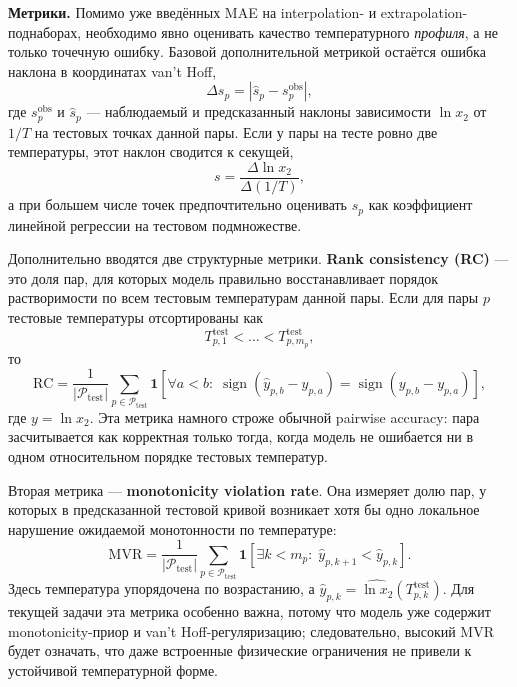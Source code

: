 \documentclass[11pt]{article}
\begin{document}
\textbf{Метрики.} Помимо уже введённых MAE на interpolation- и extrapolation-поднаборах, необходимо явно оценивать качество температурного \textit{профиля}, а не только точечную ошибку. Базовой дополнительной метрикой остаётся ошибка наклона в координатах van't Hoff,
\begin{equation*}
\Delta s_p = \left|\hat{s}_p-s^{\mathrm{obs}}_p\right|,
\end{equation*}
где $s^{\mathrm{obs}}_p$ и $\hat{s}_p$ --- наблюдаемый и предсказанный наклоны зависимости $\ln x_2$ от $1/T$ на тестовых точках данной пары. Если у пары на тесте ровно две температуры, этот наклон сводится к секущей,
\begin{equation*}
s=\frac{\Delta\ln x_2}{\Delta(1/T)},
\end{equation*}
а при большем числе точек предпочтительно оценивать $s_p$ как коэффициент линейной регрессии на тестовом подмножестве.

Дополнительно вводятся две структурные метрики. \textbf{Rank consistency (RC)} --- это доля пар, для которых модель правильно восстанавливает порядок растворимости по всем тестовым температурам данной пары. Если для пары $p$ тестовые температуры отсортированы как
\begin{equation*}
T^{\mathrm{test}}_{p,1} < \dots < T^{\mathrm{test}}_{p,m_p},
\end{equation*}
то
\begin{equation*}
\mathrm{RC} = \frac{1}{|\mathcal{P}_{\mathrm{test}}|}\sum_{p\in\mathcal{P}_{\mathrm{test}}}
\mathbf{1}\!\left[\forall a<b:\; \operatorname{sign}(\hat{y}_{p,b}-\hat{y}_{p,a}) = \operatorname{sign}(y_{p,b}-y_{p,a})\right],
\end{equation*}
где $y=\ln x_2$. Эта метрика намного строже обычной pairwise accuracy: пара засчитывается как корректная только тогда, когда модель не ошибается ни в одном относительном порядке тестовых температур.

Вторая метрика --- \textbf{monotonicity violation rate}. Она измеряет долю пар, у которых в предсказанной тестовой кривой возникает хотя бы одно локальное нарушение ожидаемой монотонности по температуре:
\begin{equation*}
\mathrm{MVR} = \frac{1}{|\mathcal{P}_{\mathrm{test}}|}\sum_{p\in\mathcal{P}_{\mathrm{test}}}
\mathbf{1}\!\left[\exists k<m_p:\; \hat{y}_{p,k+1}<\hat{y}_{p,k}\right].
\end{equation*}
Здесь температура упорядочена по возрастанию, а $\hat{y}_{p,k}=\widehat{\ln x_2}(T^{\mathrm{test}}_{p,k})$. Для текущей задачи эта метрика особенно важна, потому что модель уже содержит monotonicity-приор и van't Hoff-регуляризацию; следовательно, высокий MVR будет означать, что даже встроенные физические ограничения не привели к устойчивой температурной форме.
\end{document}
